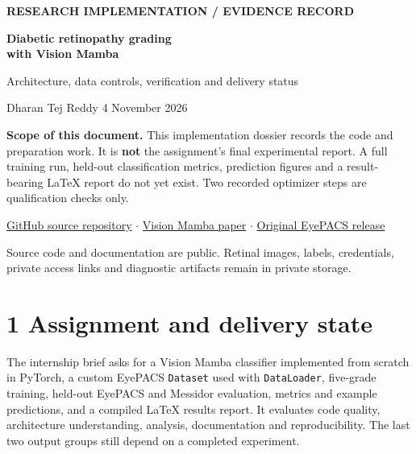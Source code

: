 \documentclass[10pt,a4paper]{article}
\newcommand{\smallhead}[1]{\vspace{5pt}{\color{teal}\bfseries #1}\par}
\newcommand{\code}[1]{\texttt{\small #1}}
\begin{document}
\vspace*{12mm}
{\Large\color{teal}\bfseries RESEARCH IMPLEMENTATION / EVIDENCE RECORD}\par
\vspace{7mm}
{\Huge\color{ink}\bfseries Diabetic retinopathy grading\\[2mm] with Vision Mamba}\par
\vspace{5mm}
{\Large\color{muted}Architecture, data controls, verification and delivery status}\par
\vspace{10mm}
{\large Dharan Tej Reddy \hfill 4 November 2026}\par
\vspace{7mm}
\colorbox{sand}{\parbox{\dimexpr\linewidth-2\fboxsep}{\small
\textbf{Scope of this document.} This implementation dossier records the
code and preparation work. It is \textbf{not} the assignment's final experimental
report. A full training run, held-out classification metrics, prediction figures
and a result-bearing LaTeX report do not yet exist. Two recorded optimizer
steps are qualification checks only.}}\par
\vspace{7mm}
\smallhead{Project links}
\href{https://github.com/dharan1007/internship-task-1}{GitHub source repository}
\quad$\cdot$\quad
\href{https://arxiv.org/abs/2401.09417}{Vision Mamba paper}
\quad$\cdot$\quad
\href{https://www.kaggle.com/competitions/diabetic-retinopathy-detection/data}{Original EyePACS release}
\par
\vspace{7mm}
\vfill
{\small\color{muted}Source code and documentation are public. Retinal images,
labels, credentials, private access links and diagnostic artifacts remain in
private storage.}
\newpage

\section*{\color{ink}1 \quad Assignment and delivery state}
The internship brief asks for a Vision Mamba classifier implemented from
scratch in PyTorch, a custom EyePACS \code{Dataset} used with
\code{DataLoader}, five-grade training, held-out EyePACS and Messidor
evaluation, metrics and example predictions, and a compiled LaTeX results
report. It evaluates code quality, architecture understanding, analysis,
documentation and reproducibility. The last two output groups still depend
on a completed experiment.
\end{document}
